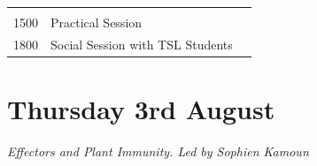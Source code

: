 \documentclass[12pt,]{book}
\begin{document}
\begin{longtable}[]{@{}lll@{}}
\begin{minipage}[t]{0.38\columnwidth}
\strut
\end{minipage}\tabularnewline
\begin{minipage}[t]{0.09\columnwidth}\raggedright\strut
1500\strut
\end{minipage} & \begin{minipage}[t]{0.33\columnwidth}\raggedright\strut
Practical Session\strut
\end{minipage} & \begin{minipage}[t]{0.38\columnwidth}\raggedright\strut
\strut
\end{minipage}\tabularnewline
\begin{minipage}[t]{0.09\columnwidth}\raggedright\strut
1800\strut
\end{minipage} & \begin{minipage}[t]{0.33\columnwidth}\raggedright\strut
Social Session with TSL Students\strut
\end{minipage} & \begin{minipage}[t]{0.38\columnwidth}\raggedright\strut
\strut
\end{minipage}\tabularnewline
\bottomrule
\end{longtable}

\section*{Thursday 3rd August}\label{thursday-3rd-august}

\emph{Effectors and Plant Immunity. Led by Sophien Kamoun}
\end{document}
